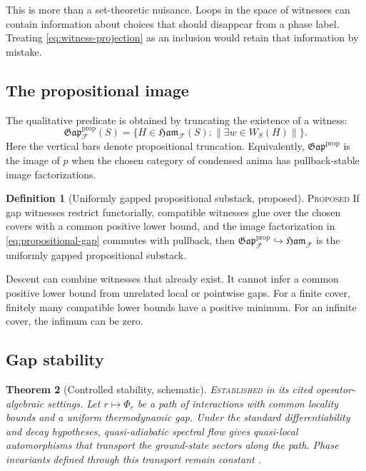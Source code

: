 \documentclass[12pt]{article}
\newtheorem{theorem}{Theorem}[section]
\theoremstyle{definition}
\newtheorem{definition}[theorem]{Definition}
\theoremstyle{remark}
\newcommand{\F}{\mathcal F}
\newcommand{\Ham}{\mathfrak{Ham}}
\newcommand{\Gap}{\mathfrak{Gap}}
\newcommand{\EST}{\textnormal{\textsc{Established}}}
\newcommand{\PROP}{\textnormal{\textsc{Proposed}}}
\begin{document}
This is more than a set-theoretic nuisance.  Loops in the space of witnesses
can contain information about choices that should disappear from a phase
label.  Treating \cref{eq:witness-projection} as an inclusion would retain
that information by mistake.

\subsection{The propositional image}

The qualitative predicate is obtained by truncating the existence of a
witness:
\begin{equation}
\Gap^{\mathrm{prop}}_{\F}(S)
=
\{H\in\Ham_{\F}(S):\|\exists w\in W_S(H)\|\}.
\label{eq:propositional-gap}
\end{equation}
Here the vertical bars denote propositional truncation.  Equivalently,
$\Gap^{\mathrm{prop}}$ is the image of $p$ when the chosen category of
condensed anima has pullback-stable image factorizations.

\begin{definition}[Uniformly gapped propositional substack, proposed]
\PROP{}  If gap witnesses restrict functorially, compatible witnesses glue
over the chosen covers with a common positive lower bound, and the image
factorization in \cref{eq:propositional-gap} commutes with pullback, then
$\Gap^{\mathrm{prop}}_{\F}\hookrightarrow\Ham_{\F}$ is the uniformly gapped
propositional substack.
\end{definition}

Descent can combine witnesses that already exist.  It cannot infer a common
positive lower bound from unrelated local or pointwise gaps.  For a finite
cover, finitely many compatible lower bounds have a positive minimum.  For
an infinite cover, the infimum can be zero.

\subsection{Gap stability}

\begin{theorem}[Controlled stability, schematic]
\label{thm:controlled-gap-stability}
\EST{} in its cited operator-algebraic settings.  Let
$r\mapsto\Phi_r$ be a path of interactions with common locality bounds and a
uniform thermodynamic gap.  Under the standard differentiability and decay
hypotheses, quasi-adiabatic spectral flow gives quasi-local automorphisms
that transport the ground-state sectors along the path.  Phase invariants
defined through this transport remain constant
\cite{BMNS2012,BachmannNachtergaele2014}.
\end{theorem}
\end{document}
